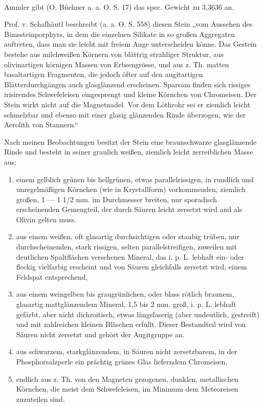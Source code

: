 \documentclass[a4paper, 11pt, oneside]{article}
\begin{document}
\paragraph{}
Ammler gibt (O. Büchner a. a. O. S. 17) das spec. Gewicht zu 3,3636 an.

Prof. v. Schafhäutl beschreibt (a. a. O. S. 558) diesen Stein „vom Aussehen des Bimssteinporphyrs, in dem die einzelnen Silikate in so großen Aggregaten auftreten, dass man sie leicht mit freiem Auge unterscheiden könne. Das Gestein bestehe aus milchweißen Körnern von blättrig strahliger Struktur, aus olivinartigen körnigen Massen von Erbsengrösse, und aus z. Th. matten basaltartigen Fragmenten, die jedoch öfter auf den augitartigen Blätterdurchgängen auch glasglänzend erscheinen. Sparsam finden sich rissiges irisirendes Schwefeleisen eingesprengt und kleine Körnchen von Chromeisen. Der Stein wirkt nicht auf die Magnetnadel. Vor dem Löthrohr sei er ziemlich leicht schmelzbar und ebenso mit einer glasig glänzenden Rinde überzogen, wie der Aerolith von Stannern.“

Nach meinen Beobachtungen besitzt der Stein eine braunschwarze glasglänzende Rinde und besteht in seiner graulich weißen, ziemlich leicht zerreiblichen Masse aus:
\begin{enumerate}
    \item einem gelblich grünen bis hellgrünen, etwas parallelrissigen, in rundlich und unregelmäßigen Körnchen (wie in Krystallform) vorkommenden, ziemlich großen, 1 — 1 1/2 mm. im Durchmesser breiten, nur sporadisch erscheinenden Gemengteil, der durch Säuren leicht zersetzt wird and als Olivin gelten muss.
    \item aus einem weißen, oft glasartig durchsichtigen oder staubig trüben, nur durchscheinenden, stark rissigen, selten parallelstreifigen, zuweilen mit deutlichen Spaltflächen versehenen Mineral, das i. p. L. lebhaft ein- oder fleckig vielfarbig erscheint und von Säuren gleichfalls zersetzt wird, einem Feldspat entsprechend,
    \item aus einem weingelben bis graugrünlichen, oder blass rötlich braunem, glasartig mattglänzendem Mineral, 1,5 bis 2 mm. groß, i. p. L. lebhaft gefärbt, aber nicht dichroitisch, etwas längsfaserig (aber undeutlich, gestreift) und mit zahlreichen kleinen Bläschen erfüllt. Dieser Bestandteil wird von Säuren nicht zersetzt und gehört der Augitgruppe an.
    \item aus schwarzem, starkglänzendem, in Säuren nicht zersetzbarem, in der Phosphorsalzperle ein prächtig grünes Glas lieferndem Chromeisen,
    \item endlich aus z. Th. von den Magneten gezogenen, dunklen, metallischen Körnchen, die meist dem Schwefeleisen, im Minimum dem Meteoreisen zuzuteilen sind.
\end{enumerate}
\end{document}
